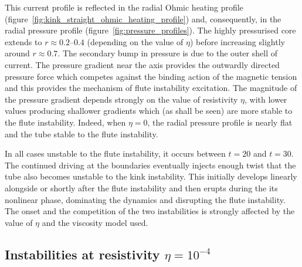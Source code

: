 \documentclass[fleqn,usenatbib]{mnras}
\newcommand{\rs}[2]{{#2}}
\begin{document}
This current profile is reflected in the radial Ohmic heating profile
(figure~\ref{fig:kink_straight_ohmic_heating_profile}) and,
consequently, in the radial pressure profile
(figure~\ref{fig:pressure_profiles}). The highly pressurised core
extends to $r\approx 0.2$--$0.4$ (depending on the value of $\eta$)
before increasing slightly around $r\approx 0.7$. The secondary bump
in pressure is due to the outer shell of current. The pressure
gradient near the axis provides the outwardly directed pressure force
which competes against the binding action of the magnetic tension
\rs{to (potentially) result in the}{and this provides the mechanism of}
flute instability \rs{}{excitation}.  The magnitude
of the pressure gradient depends strongly on the value of
\rs{}{resistivity} $\eta$, with lower values producing shallower 
gradients which (as shall be seen) are more stable to the
flute instability. Indeed, when $\eta=0$, the radial
pressure profile is nearly flat and the tube stable to the
flute instability.

In all cases unstable to the flute instability, it
occurs \rs{some time}{} between $t=20$ and $t=30$. \rs{During this
  time, the}{The} continued driving at the boundaries eventually
injects enough twist that the tube also becomes unstable to the kink
instability. This initially develops linearly alongside \rs{}{or shortly
after} the flute instability and then erupts during the
\rs{kink's}{its}  nonlinear phase, dominating the dynamics and
disrupting the   flute instability. The \rs{}{onset and
the competition} of the two instabilities is strongly affected by
the value of $\eta$ and the viscosity model used. 

\subsection{\rs{Development where}{Instabilities at resistivity} $\eta=10^{-4}$}
\end{document}
